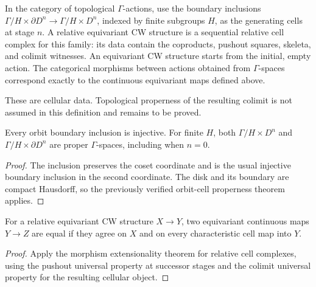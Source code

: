 \begin{definition}\label{def:equivariant-cellular-data}
\leanok
In the category of topological $\Gamma$-actions, use the boundary inclusions
$\Gamma/H\times\partial D^n\to\Gamma/H\times D^n$, indexed by finite subgroups
$H$, as the generating cells at stage $n$. A relative equivariant CW structure
is a sequential relative cell complex for this family: its data contain the
coproducts, pushout squares, skeleta, and colimit witnesses. An equivariant CW
structure starts from the initial, empty action. The categorical morphisms
between actions obtained from $\Gamma$-spaces correspond exactly to the
continuous equivariant maps defined above.

These are cellular data. Topological properness of the resulting colimit is
not assumed in this definition and remains to be proved.
\end{definition}

\begin{proposition}\label{prop:orbit-boundary-cell-properties}
Every orbit boundary inclusion is injective. For finite $H$, both
$\Gamma/H\times D^n$ and $\Gamma/H\times\partial D^n$ are proper
$\Gamma$-spaces, including when $n=0$.
\end{proposition}
\begin{proof}
\leanok
The inclusion preserves the coset coordinate and is the usual injective
boundary inclusion in the second coordinate. The disk and its boundary are
compact Hausdorff, so the previously verified orbit-cell properness theorem
applies.
\end{proof}

\begin{proposition}\label{prop:equivariant-cellular-map-ext}
For a relative equivariant CW structure $X\to Y$, two equivariant continuous
maps $Y\to Z$ are equal if they agree on $X$ and on every characteristic cell
map into $Y$.
\end{proposition}
\begin{proof}
\leanok
Apply the morphism extensionality theorem for relative cell complexes, using
the pushout universal property at successor stages and the colimit universal
property for the resulting cellular object.
\end{proof}

